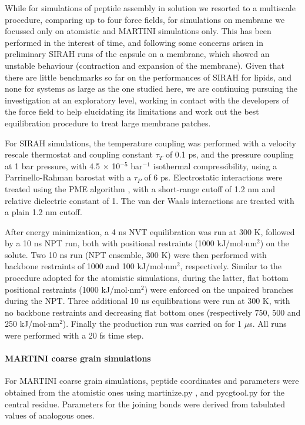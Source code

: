 While for simulations of peptide assembly in solution we resorted to a multiscale procedure, comparing up to four force fields, for simulations on membrane we focussed only on atomistic and MARTINI simulations only. This has been performed in the interest of time, and following some concerns arisen in preliminary SIRAH runs of the capsule on a membrane, which showed an unstable behaviour (contraction and expansion of the membrane).
%
Given that there are little benchmarks so far on the performances of SIRAH for lipids, and none for systems as large as the one studied here, we are continuing pursuing the investigation at an exploratory level, working in contact with the developers of the force field to help elucidating its limitations and work out the best equilibration procedure to treat large membrane patches.

For SIRAH simulations, the temperature coupling was performed with a velocity rescale thermostat \cite{Bussi2007} and coupling constant $\tau _T$ of 0.1 ps, and the pressure coupling at 1 bar pressure, with 4.5 $\times$ 10$^{-5}$ bar$^{-1}$ isothermal compressibility, using a Parrinello-Rahman barostat \cite{Parrinello1981} with a $\tau _P$ of 6 ps. Electrostatic interactions were treated using the PME algorithm \cite{Essmann1995}, with a short-range cutoff of 1.2 nm and relative dielectric constant of 1. The van der Waals interactions are treated with a plain 1.2 nm cutoff.

After energy minimization, a 4 ns NVT equilibration was run at 300 K, followed by a 10 ns NPT run, both with positional restraints (1000 kJ/mol$\cdot$nm$^2$) on the solute. Two 10 ns run (NPT ensemble, 300 K) were then performed with backbone restraints of 1000 and 100 kJ/mol$\cdot$nm$^2$, respectively. Similar to the procedure adopted for the atomistic simulations, during the latter, flat bottom positional restraints (1000 kJ/mol$\cdot$nm$^2$) were enforced on the unpaired branches during the NPT. Three additional 10 ns equilibrations were run at 300 K, with no backbone restraints and decreasing flat bottom ones (respectively 750, 500 and 250 kJ/mol$\cdot$nm$^2$). Finally the production run was carried on for 1 $\mu$s. All runs were performed with a 20 fs time step.

\paragraph{MARTINI coarse grain simulations}
For MARTINI \cite{Marrink2007, Monticelli2008} coarse grain simulations, peptide coordinates and parameters were obtained from the atomistic ones using martinize.py \cite{DeJong2013}, and pycgtool.py \cite{Graham2017} for the central residue. Parameters for the joining bonds were derived from tabulated values of analogous ones.

